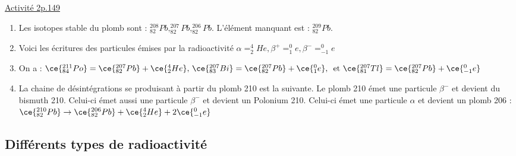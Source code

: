 \underline{Activité 2p.149}
\begin{enumerate}
    \item Les isotopes stable du plomb sont : \(^{208}_{82}Pb, ^{207}_{82}Pb, ^{206}_{82}Pb\). L'élément manquant est : \(^{209}_{82}Pb\).
    \item Voici les écritures des particules émises par la radioactivité \(\alpha =^{4}_2 He, \beta^{+} =^{0}_{1}e, \beta^{-} =^{0}_{-1}e\)
    \item On a : \(\ce{^{211}_{84}Po} = \ce{^{207}_{82}Pb} +\ce{^{4}_{2}He},\,\ce{^{207}_{83}Bi} = \ce{^{207}_{82}Pb} +\ce{^{0}_{1}e},\, \text{ et }\ce{^{207}_{81}Tl} = \ce{^{207}_{82}Pb} +\ce{^{0}_{-1}e}\) 
    \item La chaine de désintégrations se produisant à partir du plomb 210 est la suivante. Le plomb 210 émet une particule \(\beta^{-}\) et devient du bismuth 210. Celui-ci émet aussi une particule \(\beta^{-}\) et devient un Polonium 210. Celui-ci émet une particule \(\alpha\) et devient un plomb 206 : \(\ce{^{210}_{82}Pb} \to \ce{^{206}_{82}Pb} +\ce{^{4}_{2}He} + 2\ce{^{0}_{-1}e}\) 
\end{enumerate}
\newpage
\subsection{Différents types de radioactivité}
